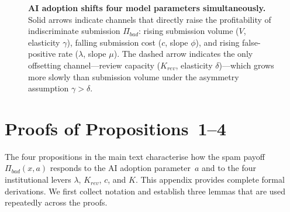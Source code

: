 \documentclass{article}
\begin{document}
\begin{figure}[H]
{%
}

\caption{\textbf{AI adoption shifts four model parameters simultaneously.}
Solid arrows indicate channels that directly raise the profitability of indiscriminate submission $\Pi_{bad}$:
rising submission volume ($V$, elasticity $\gamma$), falling submission cost ($c$, slope $\phi$),
and rising false-positive rate ($\lambda$, slope $\mu$).
The dashed arrow indicates the only offsetting channel---review capacity ($K_{rev}$, elasticity $\delta$)---which
grows more slowly than submission volume under the asymmetry assumption $\gamma > \delta$.}
\label{fig:ai_channels}
\end{figure}

\appendix

\section{Proofs of Propositions~1--4}
\label{app:proofs}

The four propositions in the main text characterise how the spam payoff $\Pi_{\mathit{bad}}(x,a)$ responds to the AI adoption parameter~$a$ and to the four institutional levers $\lambda$, $K_{\mathit{rev}}$, $c$, and $K$.
This appendix provides complete formal derivations.
We first collect notation and establish three lemmas that are used repeatedly across the proofs.
\end{document}
